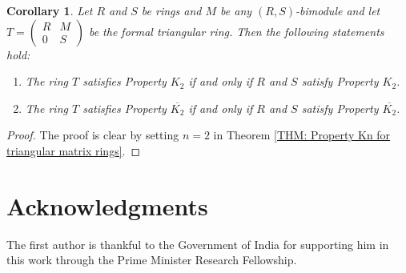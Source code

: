 \documentclass[12pt]{amsart}
\newtheorem{cor}[theorem]{Corollary}
\theoremstyle{definition}
\numberwithin{equation}{section}
\begin{document}
\begin{cor}\cite[Proposition~2.17]{khurana2018idempotents}\label{COR: Property K2 for triangular matrix rings}
    Let $R$ and $S$ be  rings and $M$ be any $(R,S)$-bimodule and let $T=\begin{pmatrix}
            R&M\\
            0&S
        \end{pmatrix}$  be the formal triangular ring. Then the following statements hold:
    \begin{enumerate}
        \item The ring $T$ satisfies Property $K_2$ if and only if $R$ and $S$ satisfy Property $K_2$. 
        \item The ring $T$ satisfies Property $\overline{K_2}$ if and only if $R$ and $S$ satisfy Property $\overline{K_2}$. 
    \end{enumerate}
\end{cor}
 \begin{proof}
     The proof is clear by setting $n=2$ in Theorem \ref{THM: Property Kn for triangular matrix rings}. 
 \end{proof}
 \section*{Acknowledgments}
 The first author is thankful to the Government of India for supporting him in this work through the Prime Minister Research Fellowship. 
 

\end{document}
